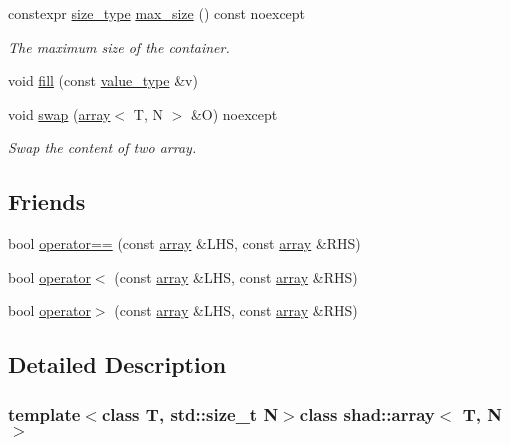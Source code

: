 \begin{DoxyCompactItemize}
constexpr \hyperlink{group__Types_ga037c76c91958f47f53bfebad4d67f8bb}{size\-\_\-type} \hyperlink{group__Capacity_ga2c375adb82992e23aaaa947f39212e25}{max\-\_\-size} () const noexcept
\begin{DoxyCompactList}\small\item\em The maximum size of the container. \end{DoxyCompactList}\item 
void \hyperlink{group__Operations_gabf303c3ba4e769b45c226523225034a3}{fill} (const \hyperlink{group__Types_gaf417752888d4f1e19286503579310a52}{value\-\_\-type} \&v)
\item 
void \hyperlink{group__Operations_ga9914edf5870a790ad4e5fb4db7556aaa}{swap} (\hyperlink{classshad_1_1array}{array}$<$ T, N $>$ \&O) noexcept
\begin{DoxyCompactList}\small\item\em Swap the content of two array. \end{DoxyCompactList}\end{DoxyCompactItemize}
\subsection*{Friends}
\begin{DoxyCompactItemize}
\item 
bool \hyperlink{classshad_1_1array_a35522f2c6c1e55e99d277c6e3ac5b2de}{operator==} (const \hyperlink{classshad_1_1array}{array} \&L\-H\-S, const \hyperlink{classshad_1_1array}{array} \&R\-H\-S)
\item 
bool \hyperlink{classshad_1_1array_a0a3e6d802b9ffe79fa2a1f25efb1e2ee}{operator$<$} (const \hyperlink{classshad_1_1array}{array} \&L\-H\-S, const \hyperlink{classshad_1_1array}{array} \&R\-H\-S)
\item 
bool \hyperlink{classshad_1_1array_a8ff1cf68a11996ff7a197a40fabac631}{operator$>$} (const \hyperlink{classshad_1_1array}{array} \&L\-H\-S, const \hyperlink{classshad_1_1array}{array} \&R\-H\-S)
\end{DoxyCompactItemize}


\subsection{Detailed Description}
\subsubsection*{template$<$class T, std\-::size\-\_\-t N$>$class shad\-::array$<$ T, N $>$}

